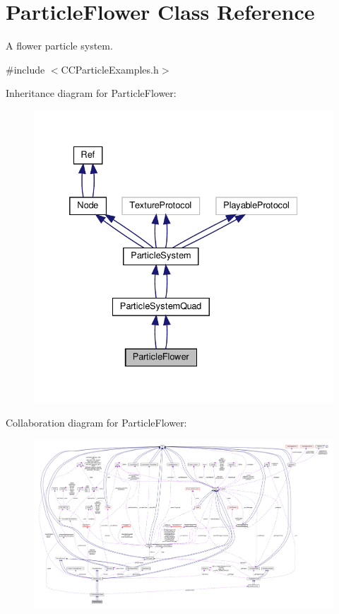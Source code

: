 \hypertarget{classParticleFlower}{}\section{Particle\+Flower Class Reference}
\label{classParticleFlower}


A flower particle system.  




{\ttfamily \#include $<$C\+C\+Particle\+Examples.\+h$>$}



Inheritance diagram for Particle\+Flower\+:
\nopagebreak
\begin{figure}[H]
\begin{center}
\leavevmode
\includegraphics[width=332pt]{classParticleFlower__inherit__graph}
\end{center}
\end{figure}


Collaboration diagram for Particle\+Flower\+:
\nopagebreak
\begin{figure}[H]
\begin{center}
\leavevmode
\includegraphics[width=350pt]{classParticleFlower__coll__graph}
\end{center}
\end{figure}
